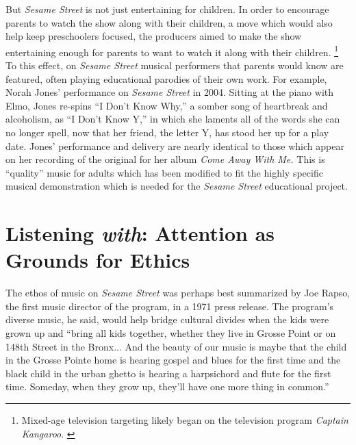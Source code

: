 \documentclass[12pt,letterpaper]{article}
\newcommand{\ses}{\textit{Sesame Street }}
\begin{document}
	But \textit{Sesame Street} is not just entertaining for children. 
	In order to encourage parents to watch the show along with their
	children, a move which would also help keep preschoolers focused,
	the producers aimed to make the show entertaining enough for parents
	to want to watch it along with their children.
	\autocite[294]{Ostrofsky2017}
	\footnote{Mixed-age television targeting likely began on the 
	television program \textit{Captain Kangaroo}. \autocite[46]{Davis}} 
	To this effect, on \ses musical performers that parents would know are 
	featured, often playing educational parodies 
	of their own work. For example, Norah Jones' performance on \ses in 
	2004.\autocite{4081} Sitting at the piano with Elmo, Jones 
	re-spins ``I Don't Know Why,'' a somber song of heartbreak and 
	alcoholism, as ``I Don't Know Y,'' in which she laments all of the 
	words she can no longer spell, now that her friend, the letter Y, has 
	stood her up for a play date. Jones' performance and delivery are nearly
	identical to those which appear on her recording of the original for her
	album \textit{Come Away With Me.} This is ``quality'' music for adults
	which has been modified to fit the highly specific musical demonstration
	which is needed for the \ses educational project.
		

	\section*{Listening \textit{with}: Attention as Grounds for Ethics}	

	The ethos of music on \textit{Sesame Street} was perhaps best 
	summarized by Joe Rapso, the first music director of the program, in a
	1971 press release. The program's diverse music, he said, would
	help bridge cultural divides when the kids were grown up and ``bring all
	kids together, whether they live in Grosse Point or on 148th Street in 
	the Bronx... And the beauty of our music is maybe that the child in the
	Grosse Pointe home is hearing gospel and blues for the first time and 
	the black child in the urban ghetto is hearing a harpsichord and flute 
	for the first time. Someday, when they grow up, they'll have one more 
	thing in common.''\autocite[297]{Ostrofsky2012}
\end{document}
